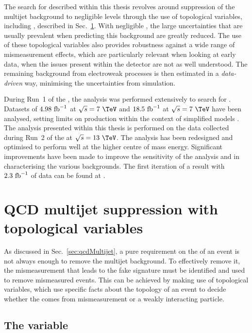 The search for \SUSY described within this thesis revolves around
suppression of the \QCD multijet background to negligible levels
through the use of topological variables, including \alphat, described
in Sec.~\ref{sec:topoVars}. With negligible \QCD, the large
uncertainties that are usually prevalent when predicting this
background are greatly reduced. The use of these topological variables
also provides robustness against a wide range of mismeasurement
effects, which are particularly relevant when looking at early data,
when the issues present within the detector are not as well
understood. The remaining background from electroweak processes is
then estimated in a \emph{data-driven} way, minimising the
uncertainties from simulation.

During Run~1 of the \LHC, the \alphat analysis was performed
extensively to search for \SUSY. Datasets of $4.98~\text{fb}^{-1}$ at
$\sqrt{s}=7~\tev$ and $18.5~\text{fb}^{-1}$ at $\sqrt{s}=7~\tev$ have been
analysed, setting limits on \SUSY production within the context of
simplified models
\cite{Chatrchyan:2011zy,Khachatryan:2011tk,Chatrchyan:2012wa,Chatrchyan:2013mys,Khachatryan:2016pxa}.
The analysis presented within this thesis is performed on the data
collected during Run~2 of the \LHC at $\sqrt{s}=13~\tev$. The analysis
has been redesigned and optimised to perform well at the higher centre
of mass energy. Significant improvements have been made to improve the
sensitivity of the analysis and in characterising the various
backgrounds. The first iteration of a result with $2.3~\text{fb}^{-1}$ of data
can be found at \cite{CMS:2015dbr}.

\section{QCD multijet suppression with topological variables} %
\label{sec:topoVars}

As discussed in Sec.~\ref{sec:qcdMultijet}, a pure requirement on the
\MET of an event is not always enough to remove the \QCD multijet
background.  To effectively remove it, the mismeasurement that leads
to the fake \MET signature must be identified and used to remove
mismeasured events. This can be achieved by making use of topological
variables, which use specific facts about the topology of an event to
decide whether the \MET comes from mismeasurement or a weakly
interacting particle. 

\subsection{The \alphat variable}

